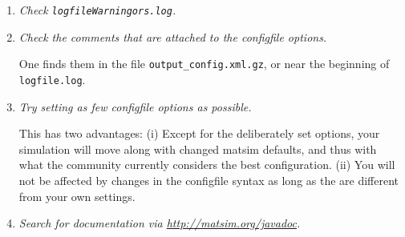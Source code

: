 \begin{enumerate}
\item \emph{Check \lstinline{logfileWarningors.log}.}

\item \emph{Check the comments that are attached to the \gls{configfile} options.}

One finds them in the file \lstinline{output_config.xml.gz}, or near the beginning of \lstinline{logfile.log}.

\item \emph{Try setting as few \gls{configfile} options as possible.}

This has two advantages: (i) Except for the deliberately set options, your simulation will move along with changed \gls{matsim} defaults, and thus with what the community currently considers the best configuration.  (ii) You will not be affected by changes in the \gls{configfile} syntax as long as the are different from your own settings.

\item \emph{Search for documentation via \url{http://matsim.org/javadoc}.}

\end{enumerate}




